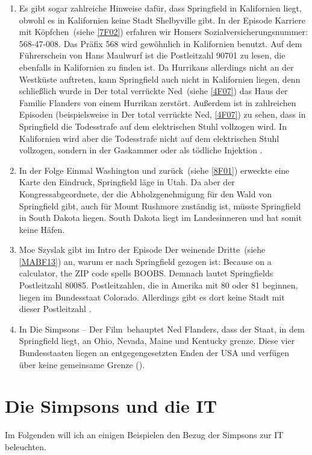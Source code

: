 \begin{appendix}
\begin{enumerate}
	\item Es gibt sogar zahlreiche Hinweise dafür, dass Springfield in Kalifornien liegt, obwohl es in Kalifornien keine Stadt Shelbyville gibt. In der Episode \glqq Karriere mit Köpfchen\grqq\ (siehe \ref{7F02}) erfahren wir Homers Sozialversicherungsnummer: 568-47-008. Das Präfix 568 wird gewöhnlich in Kalifornien benutzt. Auf dem Führerschein von Hans Maulwurf ist die Postleitzahl 90701 zu lesen, die ebenfalls in Kalifornien zu finden ist. Da Hurrikans allerdings nicht an der Westküste auftreten, kann Springfield auch nicht in Kalifornien liegen, denn schließlich wurde in \glqq Der total verrückte Ned\grqq\ (siehe \ref{4F07}) das Haus der Familie Flanders von einem Hurrikan zerstört. Außerdem ist in zahlreichen Episoden (beispielsweise in \glqq Der total verrückte Ned\grqq , \ref{4F07}) zu sehen, dass in Springfield die Todesstrafe auf dem elektrischen Stuhl vollzogen wird. In Kalifornien wird aber die Todesstrafe nicht auf dem elektrischen Stuhl vollzogen, sondern in der Gaskammer oder als tödliche Injektion \cite{Todesstrafe}.
	\item In der Folge \glqq Einmal Washington und zurück\grqq\ (siehe \ref{8F01}) erweckte eine Karte den Eindruck, Springfield läge in Utah. Da aber der Kongressabgeordnete, der die Abholzgenehmigung für den Wald von Springfield gibt, auch für Mount Rushmore zuständig ist, müsste Springfield in South Dakota liegen. South Dakota liegt im Landesinneren und hat somit keine Häfen.
	\item Moe Szyslak gibt im Intro der Episode \glqq Der weinende Dritte\grqq\ (siehe \ref{MABF13}) an, warum er nach Springfield gezogen ist: \glqq Because on a calculator, the ZIP code spells BOOBS\grqq . Demnach lautet Springfields Postleitzahl 80085. Postleitzahlen, die in Amerika mit 80 oder 81 beginnen, liegen im Bundesstaat Colorado. Allerdings gibt es dort keine Stadt mit dieser Postleitzahl \cite{ZIPCodeColorado}.
	\item In \glqq Die Simpsons -- Der Film\grqq\ behauptet Ned Flanders, dass der Staat, in dem Springfield liegt, an Ohio, Nevada, Maine und Kentucky grenze. Diese vier Bundesstaaten liegen an entgegengesetzten Enden der USA und verfügen über keine gemeinsame Grenze (\cite{Reiss19}).
\end{enumerate}

\section{Die Simpsons und die IT}\label{SimpsonsIT}
Im Folgenden will ich an einigen Beispielen den Bezug der Simpsons zur IT beleuchten.


\end{appendix}

